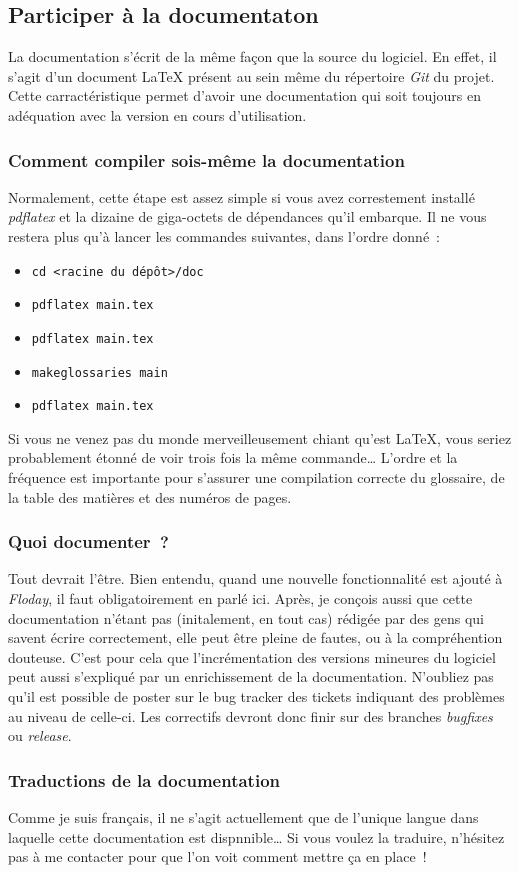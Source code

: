 \subsection{Participer à la documentaton}

La documentation s'écrit de la même façon que la source du logiciel.
En effet, il s'agit d'un document \LaTeX{} présent au sein même du répertoire \emph{Git} du projet.
Cette carractéristique permet d'avoir une documentation qui soit toujours en adéquation avec la version en cours d'utilisation.

\subsubsection{Comment compiler sois-même la documentation}
Normalement, cette étape est assez simple si vous avez correstement installé \emph{pdflatex} et la dizaine de giga-octets de dépendances qu'il embarque.
Il ne vous restera plus qu'à lancer les commandes suivantes, dans l'ordre donné~:
\begin{itemize}
	\item{\tt cd <racine du dépôt>/doc}
	\item{\tt pdflatex main.tex}
	\item{\tt pdflatex main.tex}
	\item{\tt makeglossaries main}
	\item{\tt pdflatex main.tex}
\end{itemize}
Si vous ne venez pas du monde merveilleusement chiant qu'est \LaTeX, vous seriez probablement étonné de voir trois fois la même commande\dots{}
L'ordre et la fréquence est importante pour s'assurer une compilation correcte du glossaire, de la table des matières et des numéros de pages.

\subsubsection{Quoi documenter~?}
Tout devrait l'être.
Bien entendu, quand une nouvelle fonctionnalité est ajouté à \emph{Floday}, il faut obligatoirement en parlé ici.
Après, je conçois aussi que cette documentation n'étant pas (initalement, en tout cas) rédigée par des gens qui savent écrire correctement, elle peut être pleine de fautes, ou à la compréhention douteuse.
C'est pour cela que l'incrémentation des versions mineures du logiciel peut aussi s'expliqué par un enrichissement de la documentation.
N'oubliez pas qu'il est possible de poster sur le bug tracker des tickets indiquant des problèmes au niveau de celle-ci.
Les correctifs devront donc finir sur des branches \emph{bugfixes} ou \emph{release}.

\subsubsection{Traductions de la documentation}
Comme je suis français, il ne s'agit actuellement que de l'unique langue dans laquelle cette documentation est dispnnible\dots{}
Si vous voulez la traduire, n'hésitez pas à me contacter pour que l'on voit comment mettre ça en place~!
